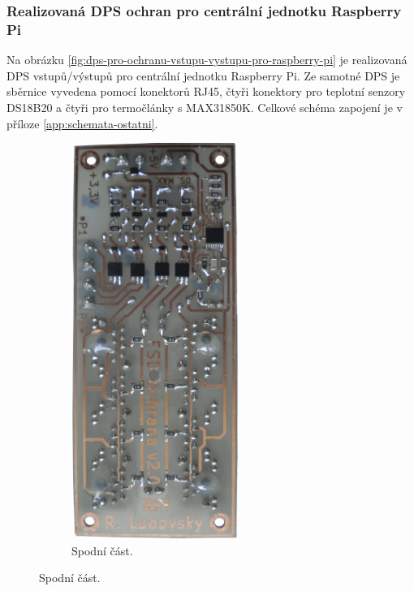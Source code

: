 \subsubsection{Realizovaná DPS ochran pro centrální jednotku Raspberry Pi}
Na obrázku \ref{fig:dps-pro-ochranu-vstupu-vystupu-pro-raspberry-pi} je realizovaná DPS vstupů/výstupů pro centrální jednotku Raspberry Pi. Ze samotné DPS je sběrnice vyvedena pomocí konektorů RJ45, čtyři konektory pro teplotní senzory DS18B20 a čtyři pro termočlánky s MAX31850K. Celkové schéma zapojení je v příloze \ref{app:schemata-ostatni}.

\begin{figure}[H]
\centering
\begin{subfigure}{.5\textwidth}
    \centering
    \includegraphics[width=0.6\textwidth]{images/vstupy-vystupu-rpi/dps-rpi-1-wire-termostaty-ochrany-spodek.png}
    \caption{Spodní část.}

\end{subfigure}
\end{figure}
